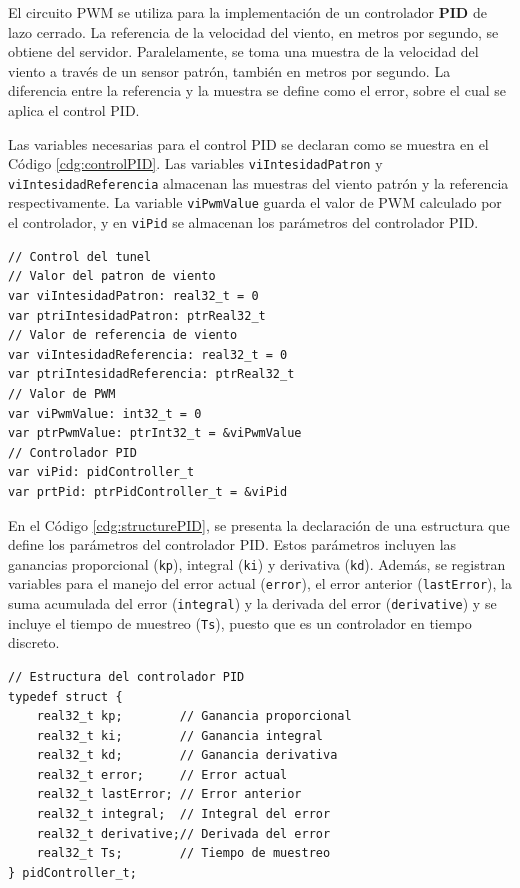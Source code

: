 El circuito PWM se utiliza para la implementación de un controlador \textbf{PID} de lazo cerrado. La referencia de la velocidad del viento, en metros por segundo, se obtiene del servidor. Paralelamente, se toma una muestra de la velocidad del viento a través de un sensor patrón, también en metros por segundo. La diferencia entre la referencia y la muestra se define como el error, sobre el cual se aplica el control PID.

Las variables necesarias para el control PID se declaran como se muestra en el Código \ref{cdg:controlPID}. Las variables \texttt{viIntesidadPatron} y \texttt{viIntesidadReferencia} almacenan las muestras del viento patrón y la referencia respectivamente. La variable \texttt{viPwmValue} guarda el valor de PWM calculado por el controlador, y en \texttt{viPid} se almacenan los parámetros del controlador PID.

\begin{lstlisting}[style=yakindustyle, caption={Declaración de variables para el controlador PID del motor del túnel de viento.}, label=cdg:controlPID]
// Control del tunel
// Valor del patron de viento
var viIntesidadPatron: real32_t = 0
var ptriIntesidadPatron: ptrReal32_t
// Valor de referencia de viento
var viIntesidadReferencia: real32_t = 0
var ptriIntesidadReferencia: ptrReal32_t
// Valor de PWM
var viPwmValue: int32_t = 0
var ptrPwmValue: ptrInt32_t = &viPwmValue
// Controlador PID
var viPid: pidController_t 
var prtPid: ptrPidController_t = &viPid
\end{lstlisting}

En el Código \ref{cdg:structurePID}, se presenta la declaración de una estructura que define los parámetros del controlador PID. Estos parámetros incluyen las ganancias proporcional (\texttt{kp}), integral (\texttt{ki}) y derivativa (\texttt{kd}). Además, se registran variables para el manejo del error actual (\texttt{error}), el error anterior (\texttt{lastError}), la suma acumulada del error (\texttt{integral}) y la derivada del error (\texttt{derivative}) y se incluye el tiempo de muestreo (\texttt{Ts}), puesto que es un controlador en tiempo discreto.

\begin{lstlisting}[style=cstyle, caption={Estructura para los parámetros y variables del controlador PID.}, label=cdg:structurePID]
// Estructura del controlador PID
typedef struct {
	real32_t kp;        // Ganancia proporcional
	real32_t ki;        // Ganancia integral
	real32_t kd;        // Ganancia derivativa
	real32_t error;     // Error actual
	real32_t lastError; // Error anterior
	real32_t integral;  // Integral del error
	real32_t derivative;// Derivada del error
	real32_t Ts;        // Tiempo de muestreo
} pidController_t;
\end{lstlisting}

